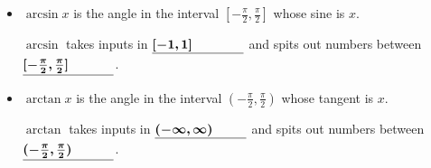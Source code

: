 \documentclass[main]{subfiles}
\begin{document}
\begin{framed}
\begin{itemize}[topsep=0pt]
\begin{itemize}[topsep=0pt]
        $\arccos$ takes inputs in $\fitb{1in}{[{-1}, 1]}$ 
        and spits out numbers between $\fitb{1in}{[0, \pi]}$.
        
        \item $\arcsin x$ is the angle in the interval $[{-\frac{\pi}{2}},
        \frac{\pi}{2}]$ whose sine is $x$.

        $\arcsin$ takes inputs in $\fitb{1in}{[{-1}, 1]}$ 
        and spits out numbers between $\fitb{1in}{[{-\frac{\pi}{2}},
        \frac{\pi}{2}]}$.
        
        \item $\arctan x$ is the angle in the interval $({-\frac{\pi}{2}},
        \frac{\pi}{2})$ whose tangent is $x$.

        $\arctan$ takes inputs in $\fitb{1in}{({-\infty}, \infty)}$ 
        and spits out numbers between $\fitb{1in}{({-\frac{\pi}{2}},
        \frac{\pi}{2})}$.
      \end{itemize}
\end{itemize}
\end{framed}
\end{document}
